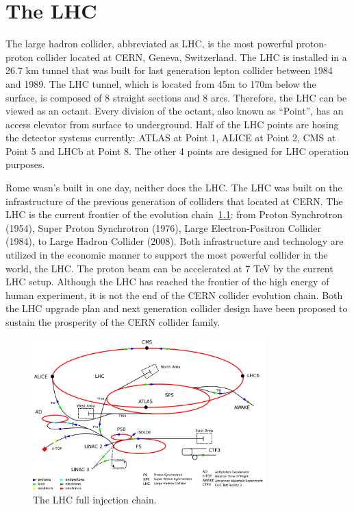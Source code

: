 \chapter{The LHC}
\label{ch:lhc}
\par The large hadron collider, abbreviated as LHC, is the most powerful proton-proton collider located at CERN, Geneva, Switzerland. The LHC is installed in a 26.7 km tunnel that was built for last generation lepton collider between 1984 and 1989. The LHC tunnel, which is located from 45m to 170m below the surface, is composed of 8 straight sections and 8 arcs. Therefore, the LHC can be viewed as an octant. Every division of the octant, also known as “Point”, has an access elevator from surface to underground. Half of the LHC points are hosing the detector systems currently: ATLAS\cite{Aad:2008zzm} at Point 1, ALICE\cite{Aamodt:2008zz} at Point 2, CMS\cite{Chatrchyan:2008aa} at Point 5 and LHCb\cite{Alves:2008zz} at Point 8. The other 4 points are designed for LHC operation purposes.

\par Rome wasn's built in one day, neither does the LHC. The LHC was built on the infrastructure of the previous generation of colliders that located at CERN. The LHC is the current frontier of the evolution chain~\ref{fig:c3cernaccs}: from Proton Synchrotron (1954)\cite{Gilardoni:2011za}, Super Proton Synchrotron (1976)\cite{Doble:2017syb}, Large Electron-Positron Collider (1984)\cite{LepInjectorStudy:1983aa}\cite{LepInjectorStudy:1983ab}, to Large Hadron Collider (2008)\cite{Bruning:2004ej}\cite{Buning:2004wk}. Both infrastructure and technology are utilized in the economic manner to support the most powerful collider in the world, the LHC. The proton beam can be accelerated at 7 TeV by the current LHC setup. Although the LHC has reached the frontier of the high energy of human experiment, it is not the end of the CERN collider evolution chain. Both the LHC upgrade plan\cite{ApollinariG.:2017ojx} and next generation collider design\cite{Benedikt:2018csr} have been proposed to sustain the prosperity of the CERN collider family.

\begin{figure}[htbp]
 \begin{center}
  \includegraphics[width=0.8\textwidth]{chapters/c3/figures/cern-accelerator-complex.png}
 \end{center}
 \caption{The LHC full injection chain.}
 \label{fig:c3cernaccs}
\end{figure}

